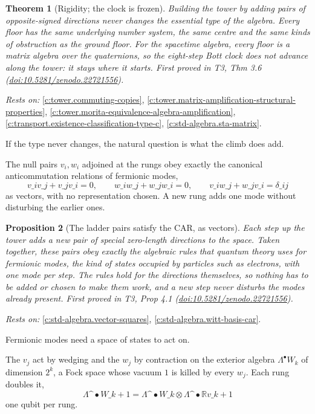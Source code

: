 \documentclass[11pt]{article}
\newtheorem{theorem}{Theorem}[section]
\newtheorem{proposition}[theorem]{Proposition}
\theoremstyle{definition}
\theoremstyle{plain}
\providecommand{\R}{}\renewcommand{\R}{\mathbb{R}}
\begin{document}
\begin{theorem}[Rigidity; the clock is frozen]\label{c:tower.rigidity-clock-frozen}
Building the tower by adding pairs of opposite-signed directions never changes the essential type of the algebra. Every floor has the same underlying number system, the same centre and the same kinds of obstruction as the ground floor. For the spacetime algebra, every floor is a matrix algebra over the quaternions, so the eight-step Bott clock does not advance along the tower: it stays where it starts.
\emph{First proved in} T3, Thm 3.6 (\href{https://doi.org/10.5281/zenodo.22721556}{doi:10.5281/zenodo.22721556}).
\end{theorem}
\noindent\emph{Rests on:} \ref{c:tower.commuting-copies}, \ref{c:tower.matrix-amplification-structural-properties}, \ref{c:tower.morita-equivalence-algebra-amplification}, \ref{c:transport.existence-classification-type-c}, \ref{c:std-algebra.sta-matrix}.

If the type never changes, the natural question is what the climb does add.

The null pairs $v_i, w_i$ adjoined at the rungs obey exactly the canonical anticommutation relations of fermionic modes, \[ v\_i v\_j + v\_j v\_i = 0, \qquad w\_i w\_j + w\_j w\_i = 0, \qquad v\_i w\_j + w\_j v\_i = \delta\_{ij} \] as vectors, with no representation chosen. A new rung adds one mode without disturbing the earlier ones.

\begin{proposition}[The ladder pairs satisfy the CAR, as vectors]\label{c:tower.ladder-pairs-satisfy-car-vectors}
Each step up the tower adds a new pair of special zero-length directions to the space. Taken together, these pairs obey exactly the algebraic rules that quantum theory uses for fermionic modes, the kind of states occupied by particles such as electrons, with one mode per step. The rules hold for the directions themselves, so nothing has to be added or chosen to make them work, and a new step never disturbs the modes already present.
\emph{First proved in} T3, Prop 4.1 (\href{https://doi.org/10.5281/zenodo.22721556}{doi:10.5281/zenodo.22721556}).
\end{proposition}
\noindent\emph{Rests on:} \ref{c:std-algebra.vector-squares}, \ref{c:std-algebra.witt-basis-car}.

Fermionic modes need a space of states to act on.

The $v_j$ act by wedging and the $w_j$ by contraction on the exterior algebra $\Lambda^\bullet W_k$ of dimension $2^k$, a Fock space whose vacuum $1$ is killed by every $w_j$. Each rung doubles it, \[ \Lambda\^{}\bullet W\_{k+1} = \Lambda\^{}\bullet W\_k \otimes \Lambda\^{}\bullet \R v\_{k+1} \] one qubit per rung.
\end{document}
